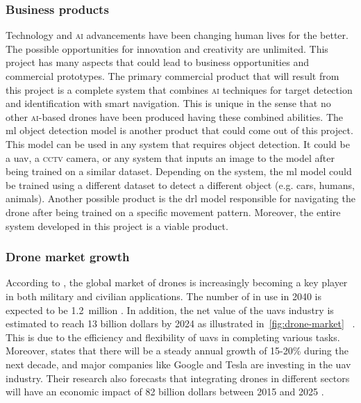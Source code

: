 
% 
\subsubsection{Business products}
        Technology and \textsc{ai} advancements have been changing human lives for the better.
	The possible opportunities for innovation and creativity are unlimited. This
	project has many aspects that could lead to business opportunities and commercial
	prototypes. 
        The primary commercial product that 
        will result from this 
        project is a complete \uav system that combines 
        \textsc{ai} techniques for target detection and
        identification with smart navigation. 
        This is unique in the sense that no other 
        \textsc{ai}-based drones have been produced 
        having these combined abilities.
	The \gls{ml} object detection model is another
        product that could come out of this project. 
        This model can be used in any system
	that requires object detection. It could be a \gls{uav}, a \textsc{cctv} camera, or
	any system that inputs an image to the model after being trained on a similar 
	dataset.
	Depending on the system, the \gls{ml} model could be trained using a different
	dataset to detect a different object (e.g. cars, humans, animals).
	Another possible product is the \gls{drl} model responsible for navigating the
	drone after being trained on a specific movement pattern.
	Moreover, the entire system developed in this project is a viable product.
	
\subsubsection{Drone market growth}
	According to \textcite{Atwater15Commercial}, the global market of drones is 
	increasingly becoming a key player in both military and civilian applications. 
        The number of \uavs in use in 2040 is expected to 
        be \SI{1.2}{million} \cite{Amo19}. In addition,
	the net value of the \glspl{uav} industry is estimated to reach 13 billion dollars
	by 2024 as illustrated in~\cref{fig:drone-market}%
        ~\cite{Mic14}. This is due to the efficiency 
	and flexibility of \glspl{uav} in completing various tasks. 
	Moreover, \textcite{Yes19} states that there will be a steady annual growth of 
	15-20\% during the next decade, and major companies like Google and Tesla are investing
	in the \gls{uav} industry. Their research also forecasts that integrating drones in
	different sectors will have an economic impact of 82 billion dollars between 2015 
        and 2025 \cite{Yes19}.
	
